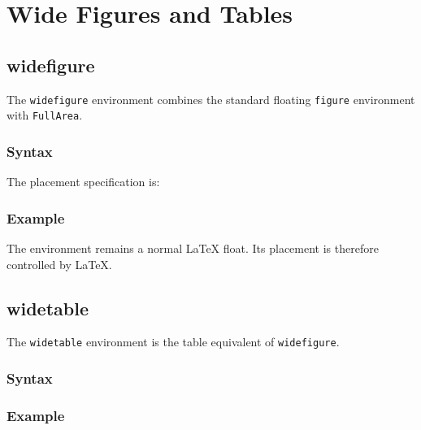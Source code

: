 \documentclass[
11pt,
a4paper,
oneside
]{scrbook}
\begin{document}

\chapter{Wide Figures and Tables}
\label{chap:wide-objects}
	
\section{widefigure}

The \texttt{widefigure} environment combines the standard floating
\texttt{figure} environment with \texttt{FullArea}.

\subsection{Syntax}
	




	
The  placement specification is:
	




	
\subsection{Example}
	




The environment remains a normal LaTeX float.
Its placement is therefore controlled by LaTeX.
	
\section{widetable}
The \texttt{widetable} environment is the table equivalent of
	\texttt{widefigure}.
	
\subsection{Syntax}
	




	
\subsection{Example}
	
\end{document}
